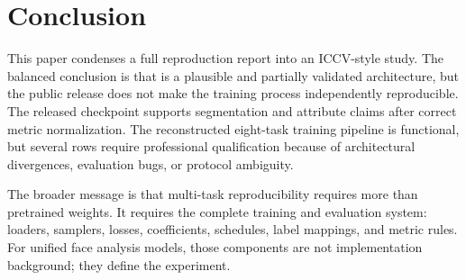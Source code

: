 \section{Conclusion}

This paper condenses a full \method reproduction report into an ICCV-style study. The balanced conclusion is that \method is a plausible and partially validated architecture, but the public release does not make the training process independently reproducible. The released checkpoint supports segmentation and attribute claims after correct metric normalization. The reconstructed eight-task training pipeline is functional, but several rows require professional qualification because of architectural divergences, evaluation bugs, or protocol ambiguity.

The broader message is that multi-task reproducibility requires more than pretrained weights. It requires the complete training and evaluation system: loaders, samplers, losses, coefficients, schedules, label mappings, and metric rules. For unified face analysis models, those components are not implementation background; they define the experiment.
